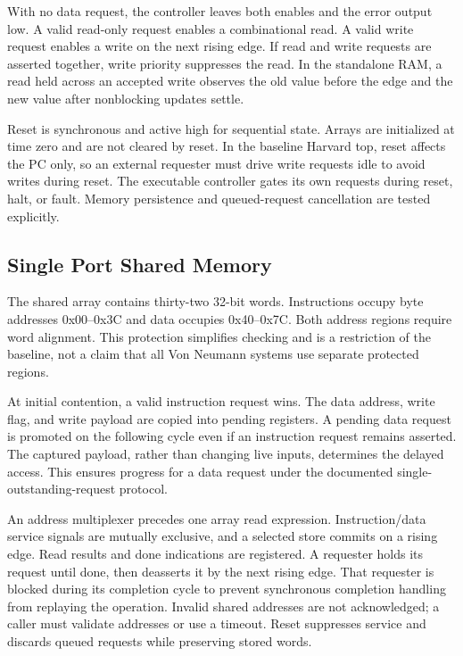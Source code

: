 \documentclass[conference,letterpaper]{IEEEtran}
\begin{document}
With no data request, the controller leaves both enables and the error output low. A valid read-only request enables a combinational read. A valid write request enables a write on the next rising edge. If read and write requests are asserted together, write priority suppresses the read. In the standalone RAM, a read held across an accepted write observes the old value before the edge and the new value after nonblocking updates settle.

Reset is synchronous and active high for sequential state. Arrays are initialized at time zero and are not cleared by reset. In the baseline Harvard top, reset affects the PC only, so an external requester must drive write requests idle to avoid writes during reset. The executable controller gates its own requests during reset, halt, or fault. Memory persistence and queued-request cancellation are tested explicitly.

\subsection{Single Port Shared Memory}

The shared array contains thirty-two 32-bit words. Instructions occupy byte addresses 0x00--0x3C and data occupies 0x40--0x7C. Both address regions require word alignment. This protection simplifies checking and is a restriction of the baseline, not a claim that all Von Neumann systems use separate protected regions.

At initial contention, a valid instruction request wins. The data address, write flag, and write payload are copied into pending registers. A pending data request is promoted on the following cycle even if an instruction request remains asserted. The captured payload, rather than changing live inputs, determines the delayed access. This ensures progress for a data request under the documented single-outstanding-request protocol.

An address multiplexer precedes one array read expression. Instruction/data service signals are mutually exclusive, and a selected store commits on a rising edge. Read results and done indications are registered. A requester holds its request until done, then deasserts it by the next rising edge. That requester is blocked during its completion cycle to prevent synchronous completion handling from replaying the operation. Invalid shared addresses are not acknowledged; a caller must validate addresses or use a timeout. Reset suppresses service and discards queued requests while preserving stored words.
\end{document}
